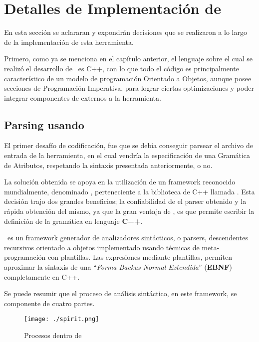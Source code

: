 \chapter{Detalles de Implementación de \maggen}
\label{chap:implem}
\minitoc

En esta sección se aclararan y expondrán decisiones que se realizaron a lo largo de la implementación de esta herramienta.

Primero, como ya se menciona en el capítulo anterior, el lenguaje sobre el cual se realizó el desarrollo de \maggen\ es C++, con lo que todo el código es principalmente característico de un modelo de programación Orientado a Objetos, aunque posee secciones de Programación Imperativa, para lograr ciertas optimizaciones y poder integrar componentes de externos a la herramienta.

\section{Parsing usando \boost\ \spirit}

El primer desafío de codificación, fue que se debía conseguir parsear el archivo de entrada de la herramienta, en el cual vendría la especificación de una Gramática de Atributos, respetando la sintaxis presentada anteriormente, o no.

La solución obtenida se apoya en la utilización de un framework reconocido mundialmente, denominado \spirit, perteneciente a la biblioteca de C++ llamada \boost. Esta decisión trajo dos grandes beneficios; la confiabilidad de el parser obtenido y la rápida obtención del mismo, ya que la gran ventaja de \spirit, es que permite escribir la definición de la gramática en lenguaje \textbf{C++}.

\spirit\ es un framework generador de analizadores sintácticos, o parsers, descendentes recursivos orientado a objetos implementado usando técnicas de meta-programación con plantillas. Las expresiones mediante plantillas, permiten aproximar la sintaxis de una ``\textit{\textit{Forma Backus Normal Extendida}}'' (\textbf{EBNF}) completamente en C++.

Se puede resumir que el proceso de análisis sintáctico, en este framework, se componente de cuatro partes.

\begin{figure}\centering
\texttt{[image: ./spirit.png]}
\caption{Procesos dentro de \spirit}\label{procesoSpirit}
\end{figure}

